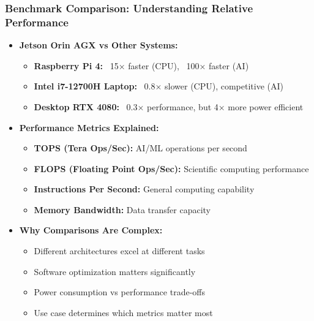 \begin{frame}
\frametitle{Benchmark Comparison: Understanding Relative Performance}
\begin{itemize}
    \item \textbf{Jetson Orin AGX vs Other Systems:}
    \begin{itemize}
        \item \textbf{Raspberry Pi 4:} ~15× faster (CPU), ~100× faster (AI)
        \item \textbf{Intel i7-12700H Laptop:} ~0.8× slower (CPU), competitive (AI)
        \item \textbf{Desktop RTX 4080:} ~0.3× performance, but 4× more power efficient
    \end{itemize}
    \item \textbf{Performance Metrics Explained:}
    \begin{itemize}
        \item \textbf{TOPS (Tera Ops/Sec):} AI/ML operations per second
        \item \textbf{FLOPS (Floating Point Ops/Sec):} Scientific computing performance
        \item \textbf{Instructions Per Second:} General computing capability
        \item \textbf{Memory Bandwidth:} Data transfer capacity
    \end{itemize}
    \item \textbf{Why Comparisons Are Complex:}
    \begin{itemize}
        \item Different architectures excel at different tasks
        \item Software optimization matters significantly
        \item Power consumption vs performance trade-offs
        \item Use case determines which metrics matter most
    \end{itemize}
\end{itemize}
\end{frame}

